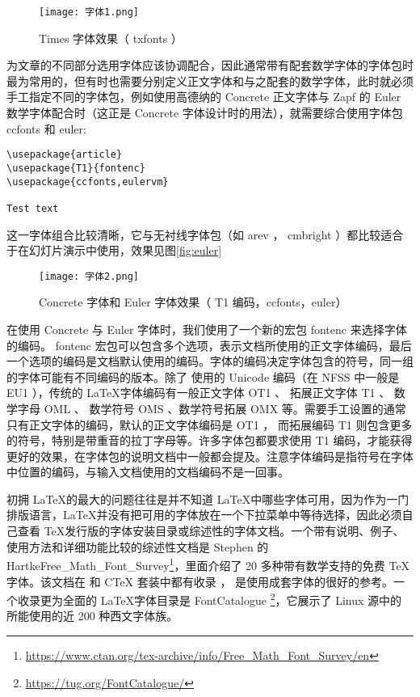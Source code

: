 \begin{figure}[H]
    \centering
    \texttt{[image: 字体1.png]}
    \caption{Times 字体效果（ txfonts ）}
    \label{fig:txfonts}
\end{figure}

为文章的不同部分选用字体应该协调配合，因此通常带有配套数学字体的字体包时最为常用的，但有时也需要分别定义正文字体和与之配套的数学字体，此时就必须手工指定不同的字体包，例如使用高德纳的 Concrete 正文字体与 Zapf 的 Euler 数学字体配合时（这正是 Concrete 字体设计时的用法），就需要综合使用字体包 ccfonts 和 euler:

\begin{lstlisting}
\usepackage{article}
\usepackage{T1}{fontenc}
\usepackage{ccfonts,eulervm}

Test text

\end{lstlisting}

这一字体组合比较清晰，它与无衬线字体包（如 arev ， cmbright ）都比较适合于在幻灯片演示中使用，效果见图\ref{fig:euler}

\begin{figure}[H]
    \centering
    \texttt{[image: 字体2.png]}
    \caption{Concrete 字体和 Euler 字体效果（ T1 编码，ccfonts，euler）}
    \label{fig:ruler}
\end{figure}

在使用 Concrete 与 Euler 字体时，我们使用了一个新的宏包 fontenc 来选择字体的编码。 fontenc 宏包可以包含多个选项，表示文档所使用的正文字体编码，最后一个选项的编码是文档默认使用的编码。字体的编码决定字体包含的符号，同一组的字体可能有不同编码的版本。除了 \XeLaTeX 使用的 Unicode 编码（在 NFSS 中一般是 EU1 ），传统的 \LaTeX 字体编码有一般正文字体 OT1 、 拓展正文字体 T1 、 数学字母 OML 、 数学符号 OMS 、数学符号拓展 OMX 等。需要手工设置的通常只有正文字体的编码，默认的正文字体编码是 OT1 ， 而拓展编码 T1 则包含更多的符号，特别是带重音的拉丁字母等。许多字体包都要求使用 T1 编码，才能获得更好的效果，在字体包的说明文档中一般都会提及。注意字体编码是指符号在字体中位置的编码，与输入文档使用的文档编码不是一回事。

初拥 \LaTeX 的最大的问题往往是并不知道 \LaTeX 中哪些字体可用，因为作为一门排版语言，\LaTeX 并没有把可用的字体放在一个下拉菜单中等待选择，因此必须自己查看 \TeX 发行版的字体安装目录或综述性的字体文档。一个带有说明、例子、使用方法和详细功能比较的综述性文档是 Stephen 的 HartkeFree\_Math\_Font\_Survey\footnote{\href{https://www.ctan.org/tex-archive/info/Free\_Math\_Font\_Survey/en}{https://www.ctan.org/tex-archive/info/Free\_Math\_Font\_Survey/en}}，里面介绍了 20 多种带有数学支持的免费 \TeX 字体。该文档在 \texlive 和 CTeX 套装中都有收录 ， 是使用成套字体的很好的参考。一个收录更为全面的 \LaTeX 字体目录是 FontCatalogue \footnote{\href{https://tug.org/FontCatalogue/}{https://tug.org/FontCatalogue/}}，它展示了 Linux 源中的 \texlive 所能使用的近 200 种西文字体族。

